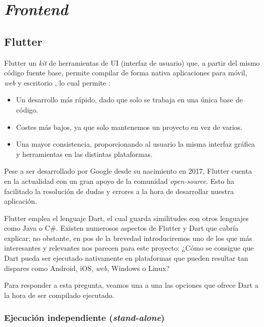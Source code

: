 \section{\emph{Frontend}} \label{sec:frontend}

\subsection{Flutter}

Flutter un \emph{kit} de herramientas de UI (interfaz de usuario) que, a partir del mismo código fuente base, permite compilar de forma nativa aplicaciones para móvil, \emph{web} y escritorio \cite{flutter-es}, lo cual permite \cite{miola20}:

\vspace{-0.5cm}
\begin{itemize}
	\item [\textbullet] Un desarrollo más rápido, dado que solo se trabaja en una única base de código.
	\item [\textbullet] Costes más bajos, ya que solo mantenemos un proyecto en vez de varios.
	\item [\textbullet] Una mayor consistencia, proporcionando al usuario la misma interfaz gráfica y herramientas en las distintas plataformas.
\end{itemize}

Pese a ser desarrollado por Google desde su nacimiento en 2017, Flutter cuenta en la actualidad con un gran apoyo de la comunidad \emph{open-source}. Esto ha facilitado la resolución de dudas y errores a la hora de desarrollar nuestra aplicación.

Flutter emplea el lenguaje Dart, el cual guarda similitudes con otros lenguajes como Java o C\#. Existen numerosos aspectos de Flutter y Dart que cabría explicar; no obstante, en pos de la brevedad introduciremos uno de los que más interesantes y relevantes nos parecen para este proyecto: ¿Cómo se consigue que Dart pueda ser ejecutado nativamente en plataformas que pueden resultar tan dispares como Android, iOS, \emph{web}, Windows o Linux?

Para responder a esta pregunta, veamos una a una las opciones que ofrece Dart a la hora de ser compilado ejecutado.

\subsubsection{Ejecución independiente (\emph{stand-alone})}

